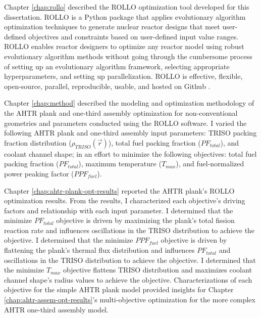 Chapter \ref{chap:rollo} described the \gls{ROLLO} optimization tool developed for this 
dissertation. 
\gls{ROLLO} is a Python package that applies evolutionary algorithm 
optimization techniques to generate nuclear reactor designs that meet user-defined 
objectives and constraints based on user-defined input value ranges. 
\gls{ROLLO} enables reactor designers to optimize any reactor model using robust 
evolutionary algorithm methods without going through the cumbersome process of setting up 
an evolutionary algorithm framework, selecting appropriate hyperparameters, and 
setting up parallelization.
\gls{ROLLO} is effective, flexible, open-source, parallel, reproducible, usable, and 
hosted on Github \cite{chee_rollo_2021}. 

Chapter \ref{chap:method} described the modeling and optimization methodology of the 
\gls{AHTR} plank and one-third assembly optimization for non-conventional 
geometries and parameters conducted using the \gls{ROLLO} software.
I varied the following \gls{AHTR} plank and one-third assembly input parameters: 
\gls{TRISO} packing fraction distribution ($\rho_{TRISO}(\vec{r})$), total fuel 
packing fraction ($PF_{total}$), and coolant channel shape; in an effort to minimize 
the following objectives: total fuel packing fraction ($PF_{total}$), maximum 
temperature ($T_{max}$), and fuel-normalized power peaking factor ($PPF_{fuel}$). 

Chapter \ref{chap:ahtr-plank-opt-results} reported the \gls{AHTR} plank's 
\gls{ROLLO} optimization results.
From the results, I characterized each objective's driving factors and relationship 
with each input parameter. 
I determined that the minimize $PF_{total}$ objective is driven by maximizing the plank's 
total fission reaction rate and influences oscillations in the TRISO distribution to 
achieve the objective. 
I determined that the minimize $PPF_{fuel}$ objective is driven by flattening the plank's
thermal flux distribution and influences $PF_{total}$ and oscillations in the TRISO 
distribution to achieve the objective.
I determined that the minimize $T_{max}$ objective flattens TRISO distribution and 
maximizes coolant channel shape's radius values to achieve the objective.
Characterizations of each objective for the simple \gls{AHTR} plank model provided 
insights for Chapter \ref{chap:ahtr-assem-opt-results}'s multi-objective 
optimization for the more complex \gls{AHTR} one-third assembly model. 


